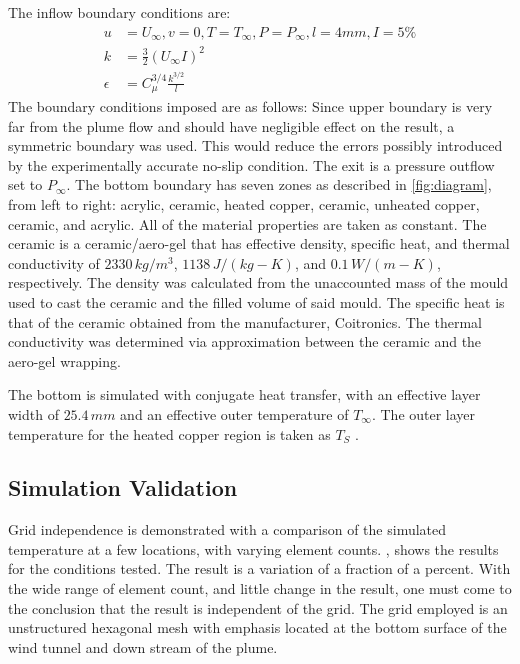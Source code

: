 \documentclass[preprint,12pt]{elsarticle}
\begin{document}
The inflow boundary conditions are:
\begin{subequations}
\label{eq:inflow}
\begin{align}
u&=U_\infty , v=0 , T=T_\infty , P = P_\infty , l=4 mm , I=5\%\\
k&=\frac{3}{2}\left(U_\infty I\right)^2 \\
\epsilon &=C_{\mu}^{3/4} \frac{k^{3/2}}{l}
\end{align}
\end{subequations}
%
The boundary conditions imposed are as follows:  Since upper boundary is very far from the plume flow and should have negligible effect on the result, a symmetric boundary was used.  This would reduce the errors possibly introduced by the experimentally accurate no-slip condition.  The exit is a pressure outflow set to $P_{\infty}$.  The bottom boundary has seven zones as described in \cref{fig:diagram}, from left to right: acrylic, ceramic, heated copper, ceramic, unheated copper, ceramic, and acrylic.  All of the material properties are taken as constant.  The ceramic is a ceramic/aero-gel that has effective density, specific heat, and thermal conductivity of $2330\, kg/m^3$, $1138 \, J/(kg-K)$, and $0.1\, W/(m-K)$, respectively.  The density was calculated from the unaccounted mass of the mould used to cast the ceramic and the filled volume of said mould.  The specific heat is that of the ceramic obtained from the manufacturer, Coitronics.  The thermal conductivity was determined via approximation between the ceramic and the aero-gel wrapping.

The bottom is simulated with conjugate heat transfer, with an effective layer width of $25.4\, mm$ and an effective outer temperature of $T_{\infty}$.  The outer layer temperature for the heated copper region is taken as $T_S$ \cite{cht12}.

\subsection{Simulation Validation}

Grid independence is demonstrated with a comparison of the simulated temperature at a few locations, with varying element counts.  , shows the results for the conditions tested.  The result is a variation of a fraction of a percent.  With the wide range of element count, and little change in the result, one must come to the conclusion that the result is independent of the grid.  The grid employed is an unstructured hexagonal mesh with emphasis located at the bottom surface of the wind tunnel and down stream of the plume.
\end{document}
